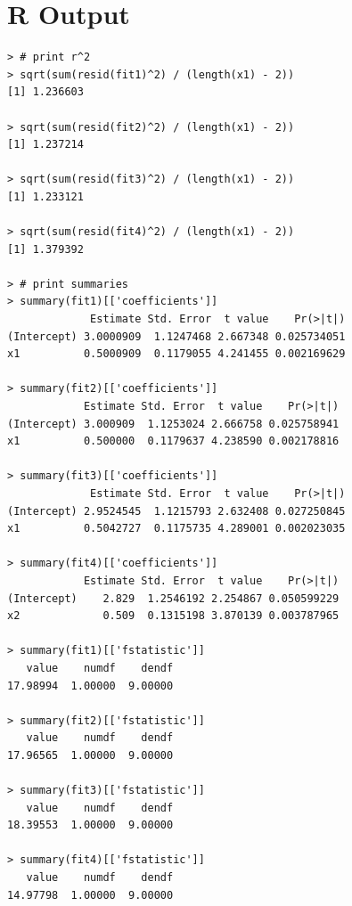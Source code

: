 \documentclass{article}
\begin{document}
\section*{R Output}
\begin{verbatim}
> # print r^2
> sqrt(sum(resid(fit1)^2) / (length(x1) - 2))
[1] 1.236603

> sqrt(sum(resid(fit2)^2) / (length(x1) - 2))
[1] 1.237214

> sqrt(sum(resid(fit3)^2) / (length(x1) - 2))
[1] 1.233121

> sqrt(sum(resid(fit4)^2) / (length(x1) - 2))
[1] 1.379392

> # print summaries
> summary(fit1)[['coefficients']]
             Estimate Std. Error  t value    Pr(>|t|)
(Intercept) 3.0000909  1.1247468 2.667348 0.025734051
x1          0.5000909  0.1179055 4.241455 0.002169629

> summary(fit2)[['coefficients']]
            Estimate Std. Error  t value    Pr(>|t|)
(Intercept) 3.000909  1.1253024 2.666758 0.025758941
x1          0.500000  0.1179637 4.238590 0.002178816

> summary(fit3)[['coefficients']]
             Estimate Std. Error  t value    Pr(>|t|)
(Intercept) 2.9524545  1.1215793 2.632408 0.027250845
x1          0.5042727  0.1175735 4.289001 0.002023035

> summary(fit4)[['coefficients']]
            Estimate Std. Error  t value    Pr(>|t|)
(Intercept)    2.829  1.2546192 2.254867 0.050599229
x2             0.509  0.1315198 3.870139 0.003787965

> summary(fit1)[['fstatistic']]
   value    numdf    dendf 
17.98994  1.00000  9.00000 

> summary(fit2)[['fstatistic']]
   value    numdf    dendf 
17.96565  1.00000  9.00000 

> summary(fit3)[['fstatistic']]
   value    numdf    dendf 
18.39553  1.00000  9.00000 

> summary(fit4)[['fstatistic']]
   value    numdf    dendf 
14.97798  1.00000  9.00000 
	\end{verbatim}
\end{document}
